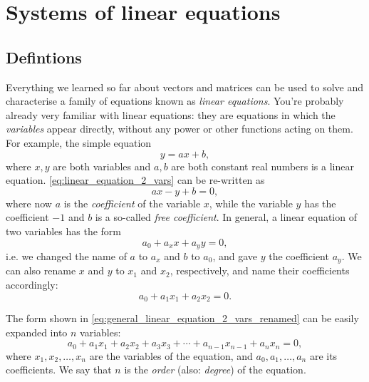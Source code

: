 \section{Systems of linear equations}
\subsection{Defintions}
Everything we learned so far about vectors and matrices can be used to solve and characterise a family of equations known as \emph{linear equations}. You're probably already very familiar with linear equations: they are equations in which the \emph{variables} appear directly, without any power or other functions acting on them. For example, the simple equation
\begin{equation}
	y = ax+b,
	\label{eq:linear_equation_2_vars}
\end{equation}
where $x,y$ are both variables and $a,b$ are both constant real numbers is a linear equation. \autoref{eq:linear_equation_2_vars} can be re-written as
\begin{equation}
	ax - y + b = 0,
	\label{eq:linear_equation_2_vars_rewritten}
\end{equation}
where now $a$ is the \emph{coefficient} of the variable $x$, while the variable $y$ has the coefficient $-1$ and $b$ is a so-called \emph{free coefficient}. In general, a linear equation of two variables has the form
\begin{equation}
	a_{0} + a_{x}x + a_{y}y = 0,
	\label{eq:general_linear_equation_2_vars}
\end{equation}
i.e. we changed the name of $a$ to $a_{x}$ and $b$ to $a_{0}$, and gave $y$ the coefficient $a_{y}$. We can also rename $x$ and $y$ to $x_{1}$ and $x_{2}$, respectively, and name their coefficients accordingly:
\begin{equation}
	a_{0} + a_{1}x_{1} + a_{2}x_{2} = 0.
	\label{eq:general_linear_equation_2_vars_renamed}
\end{equation}

The form shown in \autoref{eq:general_linear_equation_2_vars_renamed} can be easily expanded into $n$ variables:
\begin{equation}
	a_{0} + a_{1}x_{1} + a_{2}x_{2} + a_{3}x_{3} + \cdots + a_{n-1}x_{n-1} + a_{n}x_{n} = 0,
	\label{eq:general_linear_equation_n_vars}
\end{equation}
where $x_{1},x_{2},\dots,x_{n}$ are the variables of the equation, and $a_{0},a_{1},\dots,a_{n}$ are its coefficients. We say that $n$ is the \emph{order} (also: \emph{degree}) of the equation.

